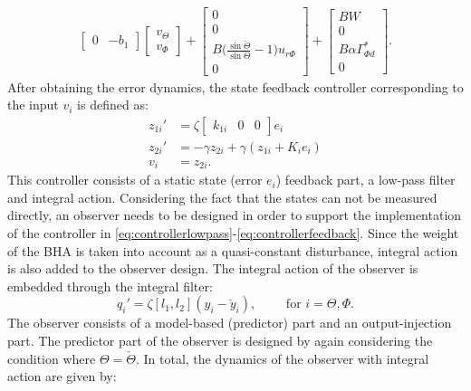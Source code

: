 \documentclass[../main.tex]{subfiles}
\begin{document}
\begin{align}
\begin{bmatrix}
	 0 & -b_1 
	 \end{bmatrix}
	 \begin{bmatrix}
	 v_\Theta \\
	 v_\Phi
	 \end{bmatrix} + 
	 \begin{bmatrix}
	 0 \\
	 0 \\
	 B\bigg( \frac{\sin \check{\Theta}}{\sin \Theta} - 1 \bigg) u_{r\Phi} \\
	 0
	 \end{bmatrix}
	 \label{eq:errordynamics2}+
	 \begin{bmatrix}
	 BW \\
	 0 \\
	 B\alpha \Gamma_{\Phi d}^* \\
	 0
	 \end{bmatrix}.
	 \end{align}
	After obtaining the error dynamics, the state feedback controller corresponding to the input $v_i$ is defined as:
	\begin{align}
		z_{1i}' &= \zeta \begin{bmatrix}
		k_{1i} & 0 & 0
		\end{bmatrix}e_i \label{eq:controllerlowpass}\\
		z_{2i}' &= -\gamma z_{2i} + \gamma (z_{1i} + K_i e_i) \label{eq:controllerintegral}\\
		v_i &= z_{2i}\label{eq:controllerfeedback}.
	\end{align}
	This controller consists of a static state (error $e_i$) feedback part, a low-pass filter and integral action. Considering the fact that the states can not be measured directly, an observer needs to be designed in order to support the implementation of the controller in \eqref{eq:controllerlowpass}-\eqref{eq:controllerfeedback}. Since the weight of the BHA is taken into account as a quasi-constant disturbance, integral action is also added to the observer design. The integral action of the observer is embedded through the integral filter:
	\begin{equation}
		q_i' = \zeta[l_1,l_2](y_i - \check{y}_i), \qquad \text{ for } i=\Theta,\Phi. \label{eq:observerintegral}
	\end{equation}
	The observer consists of a model-based (predictor) part and an output-injection part. The predictor part of the observer is designed by again considering the condition where $\Theta = \check{\Theta}$. In total, the dynamics of the observer with integral action are given by:
\end{document}
